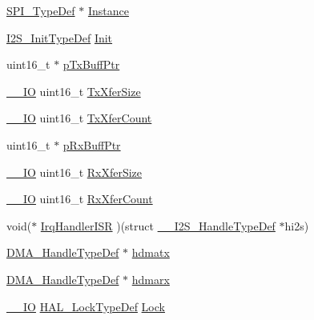 \begin{DoxyCompactItemize}
\item 
\hyperlink{struct_s_p_i___type_def}{S\+P\+I\+\_\+\+Type\+Def} $\ast$ \hyperlink{struct_____i2_s___handle_type_def_a8c1609087f90105e6c3bd82f204d8816}{Instance}
\item 
\hyperlink{struct_i2_s___init_type_def}{I2\+S\+\_\+\+Init\+Type\+Def} \hyperlink{struct_____i2_s___handle_type_def_a52d858be741f4b3567e90f88a8fba71a}{Init}
\item 
uint16\+\_\+t $\ast$ \hyperlink{struct_____i2_s___handle_type_def_ae16e02f79a15bc093107daaece074914}{p\+Tx\+Buff\+Ptr}
\item 
\hyperlink{core__sc300_8h_aec43007d9998a0a0e01faede4133d6be}{\+\_\+\+\_\+\+IO} uint16\+\_\+t \hyperlink{struct_____i2_s___handle_type_def_afe629648b19b7f099562294a8cc2c773}{Tx\+Xfer\+Size}
\item 
\hyperlink{core__sc300_8h_aec43007d9998a0a0e01faede4133d6be}{\+\_\+\+\_\+\+IO} uint16\+\_\+t \hyperlink{struct_____i2_s___handle_type_def_a450f0ddcbc23f69bb0f0dff274f65306}{Tx\+Xfer\+Count}
\item 
uint16\+\_\+t $\ast$ \hyperlink{struct_____i2_s___handle_type_def_acd0c69efb14f7826a24dce4e0046f3eb}{p\+Rx\+Buff\+Ptr}
\item 
\hyperlink{core__sc300_8h_aec43007d9998a0a0e01faede4133d6be}{\+\_\+\+\_\+\+IO} uint16\+\_\+t \hyperlink{struct_____i2_s___handle_type_def_a48cd9c3dd7e96293dc4e65f4ab0b47e7}{Rx\+Xfer\+Size}
\item 
\hyperlink{core__sc300_8h_aec43007d9998a0a0e01faede4133d6be}{\+\_\+\+\_\+\+IO} uint16\+\_\+t \hyperlink{struct_____i2_s___handle_type_def_a0bc678555f31c1de9a784b86181c0000}{Rx\+Xfer\+Count}
\item 
void($\ast$ \hyperlink{struct_____i2_s___handle_type_def_ac5352bec21daa476d2d993ea15d3b9f5}{Irq\+Handler\+I\+SR} )(struct \hyperlink{struct_____i2_s___handle_type_def}{\+\_\+\+\_\+\+I2\+S\+\_\+\+Handle\+Type\+Def} $\ast$hi2s)
\item 
\hyperlink{group___d_m_a___exported___types_ga41b754a906b86bce54dc79938970138b}{D\+M\+A\+\_\+\+Handle\+Type\+Def} $\ast$ \hyperlink{struct_____i2_s___handle_type_def_aa650704b3a3679477b1d76af7bbf867d}{hdmatx}
\item 
\hyperlink{group___d_m_a___exported___types_ga41b754a906b86bce54dc79938970138b}{D\+M\+A\+\_\+\+Handle\+Type\+Def} $\ast$ \hyperlink{struct_____i2_s___handle_type_def_a3ff52b81753a72aec6ddaeae0f96fba6}{hdmarx}
\item 
\hyperlink{core__sc300_8h_aec43007d9998a0a0e01faede4133d6be}{\+\_\+\+\_\+\+IO} \hyperlink{stm32f4xx__hal__def_8h_ab367482e943333a1299294eadaad284b}{H\+A\+L\+\_\+\+Lock\+Type\+Def} \hyperlink{struct_____i2_s___handle_type_def_ac0754c45a3816448b07d74203a136272}{Lock}

\end{DoxyCompactItemize}
